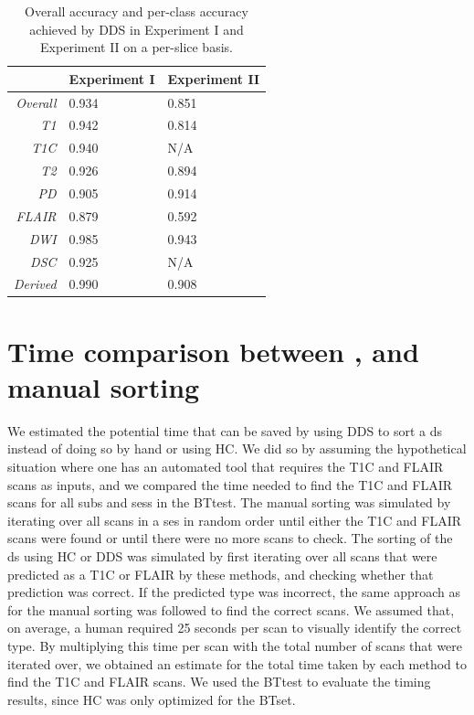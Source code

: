 \begin{subappendices}
\begin{table}[ht]
 \centering
  \caption{Overall accuracy and per-class accuracy achieved by \gls{DDS} in Experiment I and Experiment II on a per-\gls{slice} basis.}
  \label{tab:acc_slices}
  \begin{tabular}{rC{4cm}C{3cm}}
      \toprule
& \textbf{Experiment I} & \textbf{Experiment II}\\
    \midrule
  \textit{Overall}    & 0.934 & 0.851\\
  \textit{\gls{T1}}        & 0.942 & 0.814\\
  \textit{\gls{T1C}}       & 0.940 & N/A\\
  \textit{\gls{T2}}        & 0.926 & 0.894\\
  \textit{\gls{PD}}        & 0.905 & 0.914\\
  \textit{\gls{FLAIR}}  & 0.879 & 0.592\\
  \textit{\gls{DWI}}        & 0.985 & 0.943\\
  \textit{\gls{DSC}}    & 0.925 & N/A\\
  \textit{Derived}    & 0.990 & 0.908\\
  \bottomrule
  \end{tabular}
\end{table}

\clearpage
\section{Time comparison between ,  and manual sorting}
\label{app:timing}

We estimated the potential time that can be saved by using \gls{DDS} to sort a \gls{ds} instead of doing so by hand or using \gls{HC}.
We did so by assuming the hypothetical situation where one has an automated tool that requires the \gls{T1C} and \gls{FLAIR} \glspl{scan} as inputs, and we compared the time needed to find the \gls{T1C} and \gls{FLAIR} \glspl{scan} for all \glspl{sub} and \glspl{ses} in the \gls{BTtest}.
The manual sorting was simulated by iterating over all \glspl{scan} in a \gls{ses} in random order until either the \gls{T1C} and \gls{FLAIR} \glspl{scan} were found or until there were no more \glspl{scan} to check.
The sorting of the \gls{ds} using \gls{HC} or \gls{DDS} was simulated by first iterating over all \glspl{scan} that were predicted as a \gls{T1C} or \gls{FLAIR} by these methods, and checking whether that prediction was correct.
If the predicted \gls{type} was incorrect, the same approach as for the manual sorting was followed to find the correct \glspl{scan}.
We assumed that, on average, a human required 25 seconds per \gls{scan} to visually identify the correct \gls{type}.
By multiplying this time per \gls{scan} with the total number of \glspl{scan} that were iterated over, we obtained an estimate for the total time taken by each method to find the \gls{T1C} and \gls{FLAIR} \glspl{scan}.
We used the \gls{BTtest} to evaluate the timing results, since \gls{HC} was only optimized for the \gls{BTset}.


\end{subappendices}

